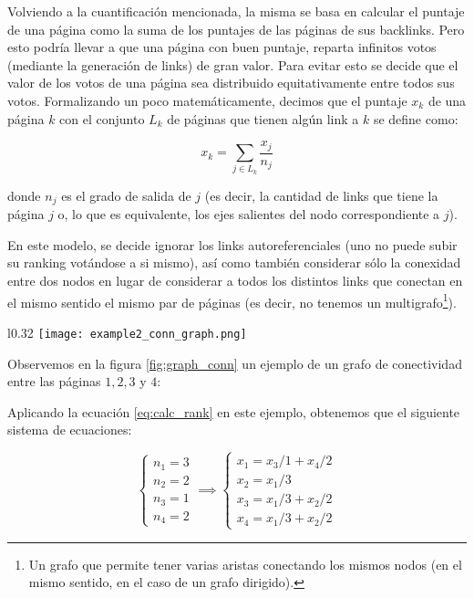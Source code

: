 \par Volviendo a la cuantificaci\'on mencionada, la misma se basa en calcular el
puntaje de una p\'agina como la suma de los puntajes de las p\'aginas de sus
backlinks. Pero esto podr\'ia llevar a que una p\'agina con buen puntaje,
reparta infinitos votos (mediante la generaci\'on de links) de gran valor. Para
evitar esto se decide que el valor de los votos de una p\'agina sea distribuido
equitativamente entre todos sus votos. Formalizando un poco matem\'aticamente,
decimos que el puntaje $x_k$ de una p\'agina $k$ con el conjunto $L_k$ de
p\'aginas que tienen alg\'un link a $k$ se define como:

\begin{equation}\label{eq:calc_rank}
    x_k = \sum_{j\in L_k} \dfrac{x_j}{n_j} 
\end{equation}

donde $n_j$ es el grado de salida de $j$ (es decir, la cantidad de links que
tiene la p\'agina $j$ o, lo que es equivalente, los ejes salientes del nodo
correspondiente a $j$).

\par En este modelo, se decide ignorar los links autoreferenciales (uno no puede
subir su ranking vot\'andose a si mismo), as\'i como tambi\'en considerar s\'olo
la conexidad entre dos nodos en lugar de considerar a todos los distintos links
que conectan en el mismo sentido el mismo par de p\'aginas (es decir, no
tenemos un multigrafo\footnote{Un grafo que permite tener varias aristas
conectando los mismos nodos (en el mismo sentido, en el caso de un grafo
dirigido).}).

\begin{wrapfigure}[12]{l}{0.32\textwidth}
    \texttt{[image: example2\_conn\_graph.png]}
    \caption{Grafo de Conectividad~\cite{Bryan2006}}
    \label{fig:graph_conn}
\end{wrapfigure}
\noindent

\par Observemos en la figura \ref{fig:graph_conn} un ejemplo de un grafo de
conectividad entre las p\'aginas $1, 2, 3$ y $4$:

\par Aplicando la ecuaci\'on \ref{eq:calc_rank} en este ejemplo, obtenemos que
el siguiente sistema de ecuaciones:

\begin{equation}
    \begin{cases}
        n_1 = 3\\
        n_2 = 2\\
        n_3 = 1\\
        n_4 = 2
    \end{cases}
    \implies
    \begin{cases}
        x_1 = x_3/1 + x_4/2\\
        x_2 = x_1/3\\
        x_3 = x_1/3 + x_2/2\\
        x_4 = x_1/3 + x_2/2
    \end{cases}
\end{equation}

